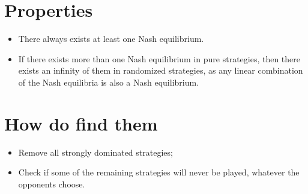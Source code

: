 \documentclass[12pt, openany]{report}
\theoremstyle{definition}
\begin{document}
\section{Properties}
\begin{itemize}
	\item There always exists at least one Nash equilibrium.
	\item If there exists more than one Nash equilibrium in pure strategies, then there exists an infinity of them in randomized strategies, as any linear combination of the Nash equilibria is also a Nash equilibrium. 
\end{itemize}
\section{How do find them}
\begin{itemize}
	\item Remove all strongly dominated strategies;
	\item Check if some of the remaining strategies will never be played, whatever the opponents choose. 
\end{itemize}
\end{document}
